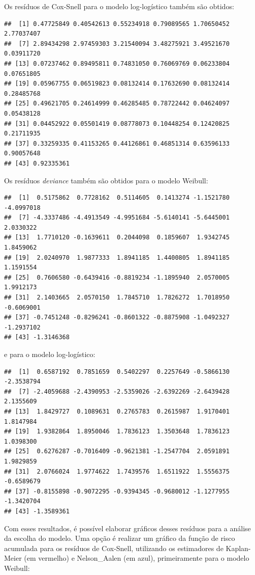 \documentclass[]{article}
\begin{document}
Os resíduos de Cox-Snell para o modelo log-logístico também são obtidos:

\begin{verbatim}
##  [1] 0.47725849 0.40542613 0.55234918 0.79089565 1.70650452 2.77037407
##  [7] 2.89434298 2.97459303 3.21540094 3.48275921 3.49521670 0.03911720
## [13] 0.07237462 0.89495811 0.74831050 0.76069769 0.06233804 0.07651805
## [19] 0.05967755 0.06519823 0.08132414 0.17632690 0.08132414 0.28485768
## [25] 0.49621705 0.24614999 0.46285485 0.78722442 0.04624097 0.05438128
## [31] 0.04452922 0.05501419 0.08778073 0.10448254 0.12420825 0.21711935
## [37] 0.33259335 0.41153265 0.44126861 0.46851314 0.63596133 0.90057648
## [43] 0.92335361
\end{verbatim}

Os resíduos \emph{deviance} também são obtidos para o modelo Weibull:

\begin{verbatim}
##  [1]  0.5175862  0.7728162  0.5114605  0.1413274 -1.1521780 -4.0997018
##  [7] -4.3337486 -4.4913549 -4.9951684 -5.6140141 -5.6445001  2.0330322
## [13]  1.7710120 -0.1639611  0.2044098  0.1859607  1.9342745  1.8459062
## [19]  2.0240970  1.9877333  1.8941185  1.4400805  1.8941185  1.1591554
## [25]  0.7606580 -0.6439416 -0.8819234 -1.1895940  2.0570005  1.9912173
## [31]  2.1403665  2.0570150  1.7845710  1.7826272  1.7018950 -0.6069001
## [37] -0.7451248 -0.8296241 -0.8601322 -0.8875908 -1.0492327 -1.2937102
## [43] -1.3146368
\end{verbatim}

e para o modelo log-logístico:

\begin{verbatim}
##  [1]  0.6587192  0.7851659  0.5402297  0.2257649 -0.5866130 -2.3538794
##  [7] -2.4059688 -2.4390953 -2.5359026 -2.6392269 -2.6439428  2.1355609
## [13]  1.8429727  0.1089631  0.2765783  0.2615987  1.9170401  1.8147984
## [19]  1.9382864  1.8950046  1.7836123  1.3503648  1.7836123  1.0398300
## [25]  0.6276287 -0.7016409 -0.9621381 -1.2547704  2.0591891  1.9829859
## [31]  2.0766024  1.9774622  1.7439576  1.6511922  1.5556375 -0.6589679
## [37] -0.8155898 -0.9072295 -0.9394345 -0.9680012 -1.1277955 -1.3420704
## [43] -1.3589361
\end{verbatim}

Com esses resultados, é possível elaborar gráficos desses resíduos para
a análise da escolha do modelo. Uma opção é realizar um gráfico da
função de risco acumulada para os resíduos de Cox-Snell, utilizando os
estimadores de Kaplan-Meier (em vermelho) e Nelson\_Aalen (em azul),
primeiramente para o modelo Weibull:
\end{document}
